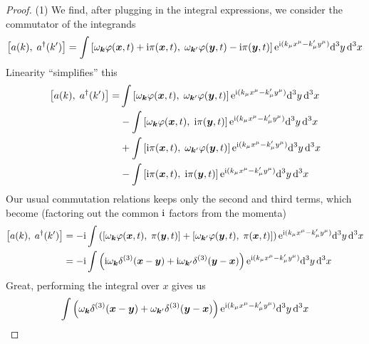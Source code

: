 \begin{proof}
(1) We find, after plugging in the integral expressions, we consider the
  commutator of the integrands
\begin{equation*}
\commutator{a(k)}{a^{\dagger}(k')}
=\int\commutator{\omega_{\vec{k}}\varphi(\vec{x},t)+\I\pi(\vec{x},t)}{\omega_{\vec{k}'}\varphi(\vec{y},t)-\I\pi(\vec{y},t)}\E^{\I (k_{\mu}x^{\mu}-k'_{\mu}y^{\mu})}\D^{3}y\,\D^{3}x
\end{equation*}
Linearity ``simplifies'' this
\begin{equation}\label{eq:proof:ladder-operator-commutation:expansion}
\begin{split}
\commutator{a(k)}{a^{\dagger}(k')}
=&\int\commutator{\omega_{\vec{k}}\varphi(\vec{x},t)}{\omega_{\vec{k}'}\varphi(\vec{y},t)}\E^{\I (k_{\mu}x^{\mu}-k'_{\mu}y^{\mu})}\D^{3}y\,\D^{3}x\\
&-\int\commutator{\omega_{\vec{k}}\varphi(\vec{x},t)}{\I\pi(\vec{y},t)}\E^{\I (k_{\mu}x^{\mu}-k'_{\mu}y^{\mu})}\D^{3}y\,\D^{3}x\\
&+\int\commutator{\I\pi(\vec{x},t)}{\omega_{\vec{k}'}\varphi(\vec{y},t)}\E^{\I (k_{\mu}x^{\mu}-k'_{\mu}y^{\mu})}\D^{3}y\,\D^{3}x\\
&-\int\commutator{\I\pi(\vec{x},t)}{\I\pi(\vec{y},t)}\E^{\I (k_{\mu}x^{\mu}-k'_{\mu}y^{\mu})}\D^{3}y\,\D^{3}x
\end{split}
\end{equation}
Our usual commutation relations keeps only the second and third terms,
which become (factoring out the common ${\rm i}$ factors from the momenta)
\begin{align}
\commutator{a(k)}{a^{\dagger}(k')}
&=-\I\int\left(\commutator{\omega_{\vec{k}}\varphi(\vec{x},t)}{\pi(\vec{y},t)}
+\commutator{\omega_{\vec{k}'}\varphi(\vec{y},t)}{\pi(\vec{x},t)}\right)\E^{\I (k_{\mu}x^{\mu}-k'_{\mu}y^{\mu})}\D^{3}y\,\D^{3}x\nonumber\\
&=-\I\int\left(\I\omega_{\vec{k}}\delta^{(3)}(\vec{x}-\vec{y})
+\I\omega_{\vec{k}'}\delta^{(3)}(\vec{y}-\vec{x})\right)\E^{\I (k_{\mu}x^{\mu}-k'_{\mu}y^{\mu})}\D^{3}y\,\D^{3}x
\end{align}
Great, performing the integral over $x$ gives us
\begin{equation}
\begin{split}
\int&\left(\omega_{\vec{k}}\delta^{(3)}(\vec{x}-\vec{y})
+\omega_{\vec{k}'}\delta^{(3)}(\vec{y}-\vec{x})\right)\E^{\I (k_{\mu}x^{\mu}-k'_{\mu}y^{\mu})}\D^{3}y\,\D^{3}x\\

\end{split}
\end{equation}
\end{proof}
